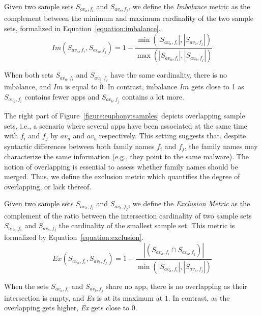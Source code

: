 \begin{definition}
	Given two sample sets $S_{av_a,f_i}$ and $S_{av_b,f_j}$, we define the \emph{Imbalance} metric as the complement between the minimum and maximum cardinality of the two sample sets, formalized in Equation~\ref{equation:imbalance}.
	\begin{equation}
		Im(S_{av_a,f_i}, S_{av_b,f_j}) = 1 - \frac{\min(|S_{av_a,f_i}|, |S_{av_b,f_j}|)}{\max(|S_{av_a,f_i}|, |S_{av_b,f_j}|)}
		\label{equation:imbalance}
	\end{equation}
\end{definition}

When both sets $S_{av_a,f_i}$ and $S_{av_b,f_j}$ have the same cardinality, there is no imbalance, and $Im$ is equal to $0$.
In contrast, imbalance $Im$ gets close to 1 as $S_{av_a,f_i}$ contains fewer apps and $S_{av_b,f_j}$ contains a lot more.

The right part of Figure~\ref{figure:euphony:samples} depicts overlapping sample sets, i.e., a scenario where several apps have been associated at the same time with $f_i$ and $f_j$ by $av_a$ and $av_b$ respectively.
This setting suggests that, despite syntactic differences between both family names $f_i$ and $f_j$, the family names may characterize the same information (e.g., they point to the same malware).
The notion of overlapping is essential to assess whether family names should be merged.
Thus, we define the exclusion metric which quantifies the degree of overlapping, or lack thereof.

\begin{definition}
	Given two sample sets $S_{av_a,f_i}$ and $S_{av_b,f_j}$, we define the \emph{Exclusion Metric} as the complement of the ratio between the intersection cardinality of two sample sets $S_{av_a,f_i}$ and $S_{av_b,f_j}$ the cardinality of the smallest sample set.
	This metric is formalized by Equation~\ref{equation:exclusion}.
	\begin{equation}
		Ex(S_{av_a,f_i}, S_{av_b,f_j}) = 1 - \frac{|(S_{av_a,f_i} \cap S_{av_b,f_j})|}{\min(|S_{av_a,f_i}|, |S_{av_b,f_j}|)}
		\label{equation:exclusion}
	\end{equation}
\end{definition}

When the sets $S_{av_a,f_i}$ and $S_{av_b,f_j}$ share no app, there is no overlapping as their intersection is empty, and {\em Ex} is at its maximum at $1$.
In contrast, as the overlapping gets higher, {\em Ex} gets close to $0$.

